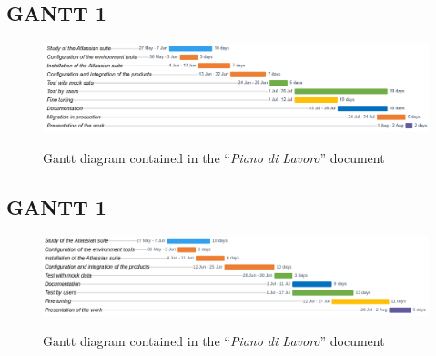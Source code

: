 \begin{landscape}
	\vspace*{\fill}
	\section{GANTT 1}
	\label{gantt_1}
	\begin{figure}[H]
		\centering
		\includegraphics[width=22cm]{resources/work_plan_gantt}\\
		\caption{Gantt diagram contained in the ``\textit{Piano di Lavoro}'' document}
	\end{figure}
	\vspace*{\fill}
\end{landscape}
\newpage
\begin{landscape}
	\vspace*{\fill}
	\section{GANTT 1}
	\label{gantt_2}
	\begin{figure}[H]
		\centering
		\includegraphics[width=22cm]{resources/revised_gantt}\\
		\caption{Gantt diagram contained in the ``\textit{Piano di Lavoro}'' document}
	\end{figure}
	\vspace*{\fill}
\end{landscape}